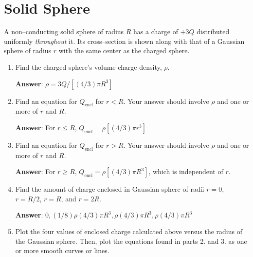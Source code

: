 \documentclass{article}
\newcommand{\ds}[0]{\displaystyle}
\begin{document}
\newpage

\section{Solid Sphere}

A non--conducting solid sphere of radius $R$ has a charge of $+3Q$ distributed uniformly \emph{throughout} it. Its cross--section is shown along with that of a Gaussian sphere of radius $r$ with the same center as the charged sphere.



\begin{enumerate}

  \item Find the charged sphere's volume charge density, $\rho$.

        \ifsolutions
        {\bf Answer}: $\ds \rho=3Q/[(4/3)\pi R^3]$
        \fi

        \ifsolutions\else
        \vskip 36pt
        \fi

  \item Find an equation for $Q_{\text{encl}}$ for $r<R$. Your answer should involve $\rho$ and one or more of $r$ and $R$.

        \ifsolutions
        {\bf Answer}: For $r \le R$, $Q_{\text{encl}}=\rho [(4/3)\pi r^3]$
        \fi

        \ifsolutions\else
        \vskip 36pt
        \fi

  \item Find an equation for $Q_{\text{encl}}$ for $r>R$. Your answer should involve $\rho$ and one or more of $r$ and $R$.

        \ifsolutions
        {\bf Answer}: For $r \ge R$,  $Q_{\text{encl}}=\rho [(4/3)\pi R^3]$, which is independent of $r$.
        \fi

        \ifsolutions\else
        \vskip 36pt
        \fi

  \item Find the amount of charge enclosed in Gaussian sphere of radii $r=0$, $r=R/2$, $r=R$, and $r=2R$.

        \ifsolutions
        {\bf Answer}: $0, (1/8)\rho (4/3)\pi R^3, \rho(4/3)\pi R^3, \rho(4/3)\pi R^3$
        \fi

        \ifsolutions\else
        \vskip 36pt
        \fi

  \item Plot the four values of enclosed charge calculated above versus the radius of the Gaussian sphere. Then, plot the equations found in parts 2. and 3. as one or more smooth curves or lines.

        \ifsolutions
        
        \fi

\end{enumerate}
\end{document}
